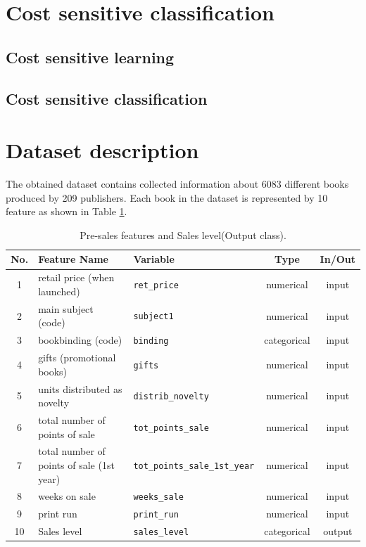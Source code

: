 \documentclass{llncs}
\begin{document}
\section{Cost sensitive classification}

\subsection{Cost sensitive learning}
\subsection{Cost sensitive classification}


\section{Dataset description}







The obtained dataset contains collected information about 6083 different books produced by 209 publishers. Each book in the dataset is represented by 10 feature as shown in Table \ref{tabla:params_pre_sales}. 


\begin{table}
\caption{Pre-sales features and Sales level(Output class). } 
\label{tabla:params_pre_sales}
\begin{center}
\begin{tabular}{|c|l|l|c|c|}
\hline 
No. & Feature Name & Variable & Type & In/Out\\
\hline 
1 & retail price (when launched) & \texttt{ret\_price} & numerical & input\\
2 & main subject (code) & \texttt{subject1} & numerical & input\\
3 & bookbinding (code) & \texttt{binding} & categorical & input\\
4 & gifts (promotional books) & \texttt{gifts} & numerical & input\\
5 & units distributed as novelty & \texttt{distrib\_novelty} & numerical & input\\
6 & total number of points of sale & \texttt{tot\_points\_sale} & numerical & input\\
7 & total number of points of sale (1st year) & \texttt{tot\_points\_sale\_1st\_year} & numerical & input\\
8 & weeks on sale & \texttt{weeks\_sale} & numerical & input\\
9 & print run & \texttt{print\_run} & numerical & input\\
\hline 
\hline
10 & Sales level & \texttt{sales\_level} & categorical & output\\
\hline 
\end{tabular}
\end{center}
\end{table}
\end{document}

